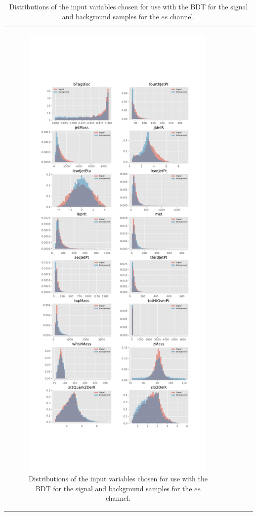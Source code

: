\begin{table}[htbp]
{\begin{tabular}{cccc}
\begin{figure}[htbp]
\centering
\includegraphics[width=0.97\textwidth]{figs/background-estimation/plots/vars_ee.pdf}
\caption{
Distributions of the input variables chosen for use with the BDT for the signal and background samples for the $ee$ channel.}
\label{fig:inputFeaturesDistributions_ee}
\end{figure}


\end{tabular}}
\end{table}
